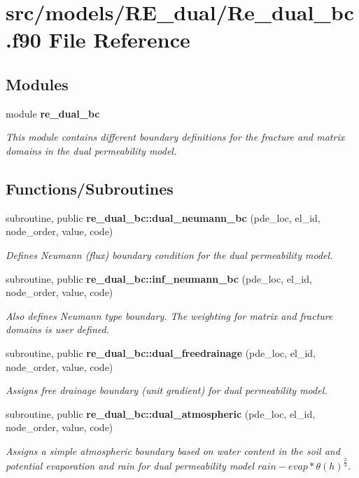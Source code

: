 \section{src/models/\+R\+E\+\_\+dual/\+Re\+\_\+dual\+\_\+bc.f90 File Reference}
\label{_re__dual__bc_8f90}
\subsection*{Modules}
\begin{DoxyCompactItemize}
\item 
module {\bf re\+\_\+dual\+\_\+bc}
\begin{DoxyCompactList}\small\item\em This module contains different boundary definitions for the fracture and matrix domains in the dual permeability model. \end{DoxyCompactList}\end{DoxyCompactItemize}
\subsection*{Functions/\+Subroutines}
\begin{DoxyCompactItemize}
\item 
subroutine, public {\bf re\+\_\+dual\+\_\+bc\+::dual\+\_\+neumann\+\_\+bc} (pde\+\_\+loc, el\+\_\+id, node\+\_\+order, value, code)
\begin{DoxyCompactList}\small\item\em Defines Neumann (flux) boundary condition for the dual permeability model. \end{DoxyCompactList}\item 
subroutine, public {\bf re\+\_\+dual\+\_\+bc\+::inf\+\_\+neumann\+\_\+bc} (pde\+\_\+loc, el\+\_\+id, node\+\_\+order, value, code)
\begin{DoxyCompactList}\small\item\em Also defines Neumann type boundary. The weighting for matrix and fracture domains is user defined. \end{DoxyCompactList}\item 
subroutine, public {\bf re\+\_\+dual\+\_\+bc\+::dual\+\_\+freedrainage} (pde\+\_\+loc, el\+\_\+id, node\+\_\+order, value, code)
\begin{DoxyCompactList}\small\item\em Assigns free drainage boundary (unit gradient) for dual permeability model. \end{DoxyCompactList}\item 
subroutine, public {\bf re\+\_\+dual\+\_\+bc\+::dual\+\_\+atmospheric} (pde\+\_\+loc, el\+\_\+id, node\+\_\+order, value, code)
\begin{DoxyCompactList}\small\item\em Assigns a simple atmospheric boundary based on water content in the soil and potential evaporation and rain for dual permeability model $rain - evap*\theta(h)^{\frac{2}{3}}$. \end{DoxyCompactList}\end{DoxyCompactItemize}

